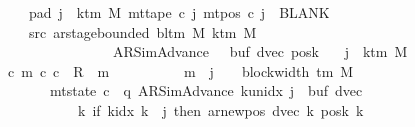 \begin{isabellebody}
\ \ \ \ \ \ \ pad{}{\isacharcolon}{\kern0pt}\ {\isachardoublequoteopen}{\isasymforall}j\ {\isasymge}\ k{\isacharunderscore}{\kern0pt}tm\ M{\isachardot}{\kern0pt}\ mt{\isacharunderscore}{\kern0pt}tape\ c{}\ j\ {\isacharparenleft}{\kern0pt}mt{\isacharunderscore}{\kern0pt}pos\ c{}\ j{\isacharparenright}{\kern0pt}\ {\isacharequal}{\kern0pt}\ BLANK{}{\isachardoublequoteclose}\isanewline
\ \ \ \ \ \ \ src{}{\isacharcolon}{\kern0pt}\ {\isachardoublequoteopen}ar{\isacharunderscore}{\kern0pt}stage{\isacharunderscore}{\kern0pt}bounded\ {\isacharparenleft}{\kern0pt}bl{\isacharunderscore}{\kern0pt}tm\ M{\isacharparenright}{\kern0pt}\ {\isacharparenleft}{\kern0pt}k{\isacharunderscore}{\kern0pt}tm\ M{\isacharparenright}{\kern0pt}\isanewline
\ \ \ \ \ \ \ \ \ \ \ \ \ \ \ \ \ \ \ {\isacharparenleft}{\kern0pt}AR{\isacharunderscore}{\kern0pt}SimAdvance{\isacharcomma}{\kern0pt}\ {}{\isacharcomma}{\kern0pt}\ {}{\isacharcomma}{\kern0pt}\ buf{}{\isacharcomma}{\kern0pt}\ dvec{\isacharcomma}{\kern0pt}\ posk{}{\isacharparenright}{\kern0pt}{\isachardoublequoteclose}\isanewline
\ \ \ {\isachardoublequoteopen}j\ {\isasymle}\ k{\isacharunderscore}{\kern0pt}tm\ M\ {\isacharminus}{\kern0pt}\ {}\ {\isasymLongrightarrow}\isanewline
\ \ \ \ {\isacharparenleft}{\kern0pt}{\isasymexists}c\ m{\isachardot}{\kern0pt}\ {\isacharparenleft}{\kern0pt}c{}{\isacharcomma}{\kern0pt}\ c{\isacharparenright}{\kern0pt}\ {\isasymin}\ R{\isacharprime}{\kern0pt}\ {\isacharcircum}{\kern0pt}{\isacharcircum}{\kern0pt}\ m\isanewline
\ \ \ \ \ \ \ \ \ {\isasymand}\ m\ {\isasymle}\ j\ {\isacharasterisk}{\kern0pt}\ {\isacharparenleft}{\kern0pt}{}\ {\isacharasterisk}{\kern0pt}\ block{\isacharunderscore}{\kern0pt}width\ {\isacharparenleft}{\kern0pt}{\isasymGamma}{\isacharunderscore}{\kern0pt}tm\ M{\isacharparenright}{\kern0pt}{\isacharparenright}{\kern0pt}\isanewline
\ \ \ \ \ \ \ \ \ {\isasymand}\ mt{\isacharunderscore}{\kern0pt}state\ c\ {\isacharequal}{\kern0pt}\ {\isacharparenleft}{\kern0pt}q{\isacharcomma}{\kern0pt}\ AR{\isacharunderscore}{\kern0pt}SimAdvance{\isacharcomma}{\kern0pt}\ k{\isacharunderscore}{\kern0pt}unidx\ j{\isacharcomma}{\kern0pt}\ {}{\isacharcomma}{\kern0pt}\ buf{}{\isacharcomma}{\kern0pt}\ dvec{\isacharcomma}{\kern0pt}\isanewline
\ \ \ \ \ \ \ \ \ \ \ \ \ \ {\isacharparenleft}{\kern0pt}{\isasymlambda}k{\isachardot}{\kern0pt}\ if\ k{\isacharunderscore}{\kern0pt}idx\ k\ {\isacharless}{\kern0pt}\ j\ then\ ar{\isacharunderscore}{\kern0pt}newpos\ {\isacharparenleft}{\kern0pt}dvec\ k{\isacharparenright}{\kern0pt}\ {\isacharparenleft}{\kern0pt}posk{}\ k{\isacharparenright}{\kern0pt}\isanewline

\end{isabellebody}
